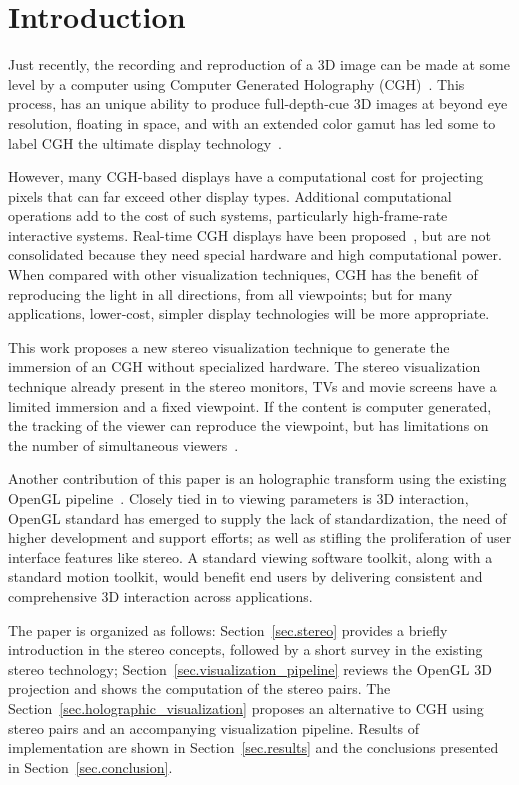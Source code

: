 \section{Introduction}
\label{sec.introduction}

Just recently, the recording and reproduction of a 3D image can be made at some level by a computer using Computer Generated Holography (CGH)~\cite{Lucente1992}. This process, has an unique ability to produce full-depth-cue 3D images at beyond eye resolution, floating in space, and with an extended color gamut has led some to label CGH the ultimate display technology~\cite{Slinger2005}. 

However, many CGH-based displays have a computational cost for projecting pixels that can far exceed other display types. Additional computational operations add to the cost of such systems, particularly high-frame-rate interactive systems. Real-time CGH displays have been proposed~\cite{Lucente1992, Watlington1995, Lucente2012}, but are not consolidated because they need special hardware and high computational power. When compared with other visualization techniques, CGH has the benefit of reproducing the light in all directions, from all viewpoints; but for many applications, lower-cost, simpler display technologies will be more appropriate. 

This work proposes a new stereo visualization technique to generate the immersion of an CGH without specialized hardware.  The stereo visualization technique already present in the stereo monitors, TVs and movie screens have a limited immersion and a fixed viewpoint. If the content is computer generated, the tracking of the viewer can reproduce the viewpoint, but has limitations on the number of simultaneous viewers~\cite{Harris2010}.

Another contribution of this paper is an holographic transform using the existing OpenGL pipeline~\cite{schreiner2004}. Closely tied in to viewing parameters is 3D interaction, OpenGL standard has emerged to supply the lack of standardization, the need of higher development and support efforts; as well as stifling the proliferation of user interface features like stereo. A standard viewing software toolkit, along with a standard motion toolkit, would benefit end users by delivering consistent and comprehensive 3D interaction across applications.

The paper is organized as follows: Section~\ref{sec.stereo} provides a briefly introduction in the stereo concepts, followed by a short survey in the existing stereo technology; Section~\ref{sec.visualization_pipeline} reviews the OpenGL 3D projection and shows the computation of the stereo pairs. The Section~\ref{sec.holographic_visualization} proposes an alternative to CGH using stereo pairs and an accompanying visualization pipeline. Results of implementation are shown in Section~\ref{sec.results} and the conclusions presented in Section~\ref{sec.conclusion}.


